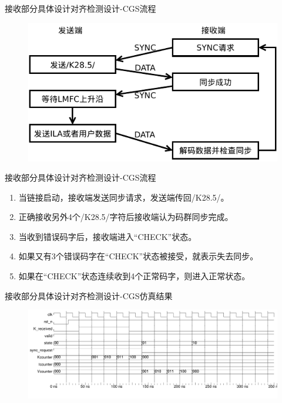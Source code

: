 \documentclass{beamer}
\begin{document}
\begin{frame}{接收部分具体设计}{对齐检测设计-CGS流程}
  \begin{figure}
  \centering
  \includegraphics[scale=0.8]{./img/cgs_subclass_1_2.pdf}
  \end{figure}
\end{frame}

\begin{frame}{接收部分具体设计}{对齐检测设计-CGS流程}
  \begin{enumerate}
  \item 当链接启动，接收端发送同步请求，发送端传回/K28.5/。
  \item 正确接收另外4个/K28.5/字符后接收端认为码群同步完成。
  \item 当收到错误码字后，接收端进入“CHECK”状态。
  \item 如果又有3个错误码字在“CHECK”状态被接受，就表示失去同步。
  \item 如果在“CHECK”状态连续收到4个正常码字，则进入正常状态。
  \end{enumerate}
\end{frame}

\begin{frame}{接收部分具体设计}{对齐检测设计-CGS仿真结果}
  \begin{figure}
  \includegraphics[scale=0.4]{./img/cgs_detection_wave.pdf}
  \end{figure}
\end{frame}
\end{document}
